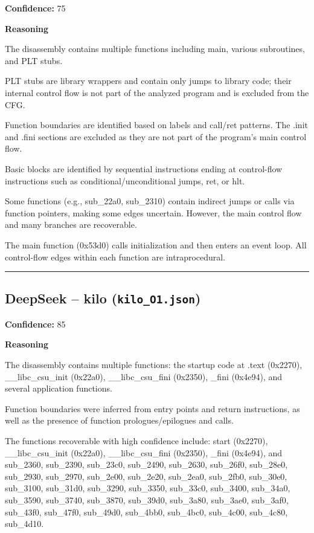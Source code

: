\textbf{Confidence:} 75

\textbf{Reasoning}

The disassembly contains multiple functions including main, various subroutines, and PLT stubs.

PLT stubs are library wrappers and contain only jumps to library code; their internal control flow is not part of the analyzed program and is excluded from the CFG.

Function boundaries are identified based on labels and call/ret patterns. The .init and .fini sections are excluded as they are not part of the program's main control flow.

Basic blocks are identified by sequential instructions ending at control-flow instructions such as conditional/unconditional jumps, ret, or hlt.

Some functions (e.g., sub\_22a0, sub\_2310) contain indirect jumps or calls via function pointers, making some edges uncertain. However, the main control flow and many branches are recoverable.

The main function (0x53d0) calls initialization and then enters an event loop. All control-flow edges within each function are intraprocedural.

\bigskip
\hrule
\bigskip

\subsection{DeepSeek -- kilo (\texttt{kilo\_O1.json})}

\textbf{Confidence:} 85

\textbf{Reasoning}

The disassembly contains multiple functions: the startup code at .text (0x2270), \_\_libc\_csu\_init (0x22a0), \_\_libc\_csu\_fini (0x2350), \_fini (0x4e94), and several application functions.

Function boundaries were inferred from entry points and return instructions, as well as the presence of function prologues/epilogues and calls.

The functions recoverable with high confidence include: start (0x2270), \_\_libc\_csu\_init (0x22a0), \_\_libc\_csu\_fini (0x2350), \_fini (0x4e94), and sub\_2360, sub\_2390, sub\_23c0, sub\_2490, sub\_2630, sub\_26f0, sub\_28e0, sub\_2930, sub\_2970, sub\_2e00, sub\_2e20, sub\_2ea0, sub\_2fb0, sub\_30e0, sub\_3100, sub\_31d0, sub\_3290, sub\_3350, sub\_33c0, sub\_3400, sub\_34a0, sub\_3590, sub\_3740, sub\_3870, sub\_39d0, sub\_3a80, sub\_3ae0, sub\_3af0, sub\_43f0, sub\_47f0, sub\_49d0, sub\_4bb0, sub\_4bc0, sub\_4c00, sub\_4c80, sub\_4d10.

